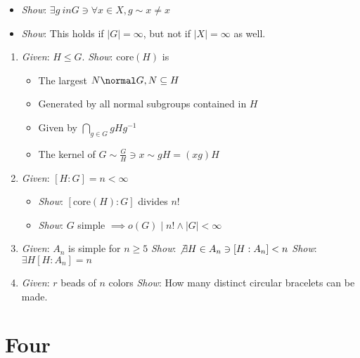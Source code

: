 \begin{itemize}
\tightlist
\item
  \emph{Show}: $\exists g\ in G \ni \forall x\in X, g\sim x \neq x$
\item
  \emph{Show}: This holds if $|G| = \infty$, but not if $|X| = \infty$
  as well.
\end{itemize}

\begin{enumerate}
\def\labelenumi{\arabic{enumi}.}
\setcounter{enumi}{5}
\item
  \emph{Given}: $H \leq G$. \emph{Show}: $\text{core}(H)$ is

  \begin{itemize}
  \tightlist
  \item
    The largest $N \normal G, N \subseteq H$
  \item
    Generated by all normal subgroups contained in $H$
  \item
    Given by $\bigcap_{g\in G} gHg^{-1}$
  \item
    The kernel of $G \sim \frac{G}{H} \ni x \sim gH = (xg)H$
  \end{itemize}
\item
  \emph{Given}: $[H : G]= n < \infty$

  \begin{itemize}
  \tightlist
  \item
    \emph{Show}: $[\text{core}(H) : G]$ divides $n!$
  \item
    \emph{Show}: $G$ simple $\implies o(G) \mid n! \wedge |G| < \infty$
  \end{itemize}
\item
  \emph{Given}: $A_n$ is simple for $n\geq 5$ \emph{Show}:
  $\not \exists H \in A_n \ni [H : A_n] < n$ \emph{Show}:
  $\exists H [H : A_n] = n$
\item
  \emph{Given}: $r$ beads of $n$ colors \emph{Show}: How many distinct
  circular bracelets can be made.
\end{enumerate}

\hypertarget{four}{%
\section{Four}\label{four}}

